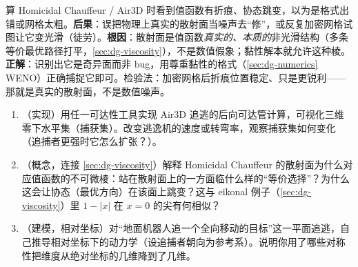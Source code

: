 \begin{pitfall}
算 Homicidal Chauffeur / Air3D 时看到值函数有折痕、协态跳变，以为是格式出错或网格太粗。\textbf{后果}：误把物理上真实的散射面当噪声去“修”，或反复加密网格试图让它变光滑（徒劳）。\textbf{根因}：散射面是值函数\emph{真实的、本质的}非光滑结构（多条等价最优路径打平，\cref{sec:dg-viscosity}），不是数值假象；黏性解本就允许这种棱。\textbf{正解}：识别出它是奇异面而非 bug，用尊重黏性的格式（\cref{sec:dg-numerics} WENO）正确捕捉它即可。检验法：加密网格后折痕位置稳定、只是更锐利——那就是真实的散射面，不是数值噪声。
\end{pitfall}

\begin{practice}
\begin{enumerate}
  \item （实现）用任一可达性工具实现 Air3D 追逃的后向可达管计算，可视化三维零下水平集（捕获集）。改变逃逸机的速度或转弯率，观察捕获集如何变化（追捕者更强时它怎么扩张？）。
  \item （概念，连接 \cref{sec:dg-viscosity}）解释 Homicidal Chauffeur 的散射面为什么对应值函数的不可微棱：站在散射面上的一方面临什么样的“等价选择”？为什么这会让协态（最优方向）在该面上跳变？这与 eikonal 例子（\cref{sec:dg-viscosity}）里 $1-|x|$ 在 $x=0$ 的尖有何相似？
  \item （建模，相对坐标）对“地面机器人追一个全向移动的目标”这一平面追逃，自己推导相对坐标下的动力学（设追捕者朝向为参考系）。说明你用了哪些对称性把维度从绝对坐标的几维降到了几维。
\end{enumerate}
\end{practice}

